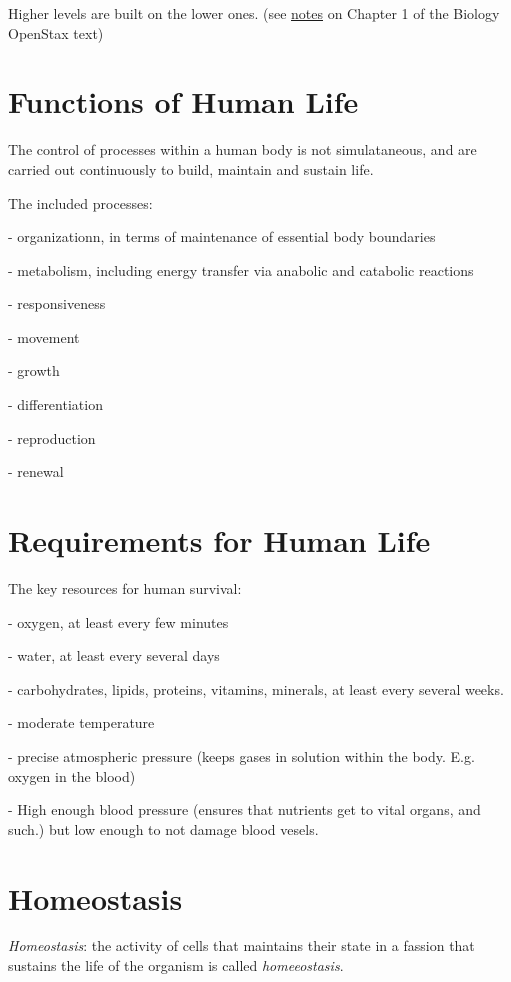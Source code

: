 \documentclass{article}
\theoremstyle{definition}
\begin{document}
Higher levels are built on the lower ones. (see \href{https://github.com/jbrannan565/Bio-101-Reading-Notes/blob/main/bio_2e/Ch_1.pdf}{notes} on Chapter 1 of the Biology OpenStax text)

\section{Functions of Human Life}
The control of processes within a human body is not simulataneous, and are carried out continuously to build, maintain and sustain life. 

The included processes:

- organizationn, in terms of maintenance of essential body boundaries

- metabolism, including energy transfer via anabolic and catabolic reactions

- responsiveness

- movement

- growth

- differentiation

- reproduction

- renewal

\section{Requirements for Human Life}

The key resources for human survival:

- oxygen, at least every few minutes

- water, at least every several days

- carbohydrates, lipids, proteins, vitamins, minerals, at least every several weeks.

- moderate temperature

- precise atmospheric pressure (keeps gases in solution within the body. E.g. oxygen in the blood)

- High enough blood pressure (ensures that nutrients get to vital organs, and such.) but low enough to not damage blood vesels.

\section{Homeostasis}

 \textit{Homeostasis}: the activity of cells that maintains their state in a fassion that sustains the life of the organism is called \textit{homeeostasis}.
\end{document}
